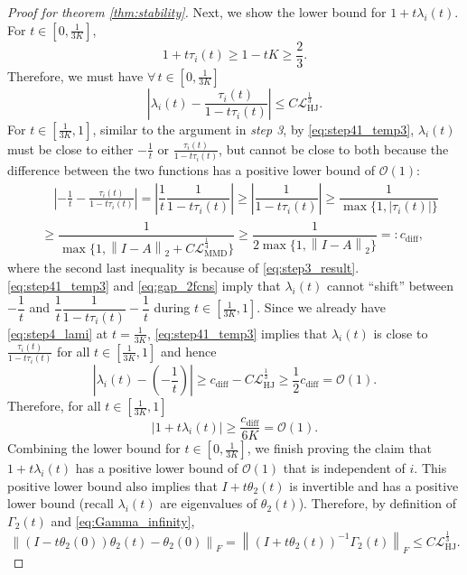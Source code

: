 \documentclass{article} %
\theoremstyle{plain}
\theoremstyle{definition}
\theoremstyle{remark}
\newcommand{\cO}{\mathcal{O}}
\newcommand{\norm}[2][H^s]{\left\|#2\right\|_{#1}}
\newcommand{\LMMD}{\mathcal{L}_{\text{MMD}}}
\newcommand{\LHJ}{\mathcal{L}_{\text{HJ}}}
\newcommand{\lam}{\lambda}
\newcommand{\Ge}{\Gamma_2}
\newcommand{\abs}[1]{\left|#1\right|}
\begin{document}
\begin{proof}[Proof for theorem \ref{thm:stability}]
Next, we show the lower bound for $1+t \lam_i(t)$. For $t\in [0,\frac{1}{3K}]$, 
$$1 + t\tau_i(t) \ge 1 - t K \ge \frac23.$$
Therefore, we must have $\forall \, t\in [0,\frac{1}{3K}]$
\begin{equation}\label{eq:step4_lami}
\abs{\lam_i(t) - \dfrac{\tau_i(t)}{1-t\tau_i(t)}} \le C \LHJ^{\frac13}.
\end{equation}
For $t \in [\frac{1}{3K}, 1]$, similar to the argument in \emph{step 3}, by \eqref{eq:step41_temp3}, $\lam_i(t)$ must be close to either $-\frac1t$ or $\frac{\tau_i(t)}{1-t\tau_i(t)}$, but cannot be close to both because the difference between the two functions has a positive lower bound of $\cO(1)$:
\begin{equation}\label{eq:gap_2fcns}
\begin{aligned}
& \quad \abs{-\frac1t - \frac{\tau_i(t)}{1-t\tau_i(t)}}=\abs{\dfrac{1}{t} \dfrac{1}{1 - t \tau_i(t)}} \ge \abs{\dfrac{1}{1 - t \tau_i(t)}} \ge \dfrac{1}{\max\{1,|\tau_i(t)|\}} \\
&\ge \dfrac{1}{\max\{1,\norm[2]{I-A} + C \LMMD^{\frac14} \}} \ge \dfrac{1}{2\max\{1,\norm[2]{I-A} \}} =: c_{\textrm{diff}},
\end{aligned}
\end{equation}
where the second last inequality is because of \eqref{eq:step3_result}. \eqref{eq:step41_temp3} and \eqref{eq:gap_2fcns} imply that $\lam_i(t)$ cannot ``shift'' between $-\dfrac{1}{t}$ and $\dfrac{1}{t} \dfrac{1}{1 - t \tau_i(t)} -\dfrac{1}{t}$ during $t\in[\frac{1}{3K},1]$. Since we already have \eqref{eq:step4_lami} at $t=\frac{1}{3K}$, \eqref{eq:step41_temp3} implies that $\lam_i(t)$ is close to $\frac{\tau_i(t)}{1-t\tau_i(t)}$ for all $t \in [\frac{1}{3K},1]$ and hence 
$$\abs{\lam_i(t) - (-\frac1t)} \ge c_{\text{diff}} - C \LHJ^{\frac13} \ge \frac12 c_{\text{diff}} = \cO(1).$$
Therefore, for all $t \in [\frac{1}{3K}, 1]$
$$\abs{1+t\lam_i(t)} \ge \dfrac{c_{\text{diff}}}{6K}=\cO(1).$$
Combining the lower bound for $t \in [0, \frac{1}{3K}]$, we finish proving the claim that $1+t\lam_i(t)$ has a positive lower bound of $\cO(1)$ that is independent of $i$. This positive lower bound also implies that $I + t \theta_2(t)$ is invertible and has a positive lower bound (recall $\lam_i(t)$ are eigenvalues of $\theta_2(t)$). Therefore, by definition of $\Ge(t)$ and \eqref{eq:Gamma_infinity},
\begin{equation}\label{eq:step41_temp1}
\norm[F]{(I-t\theta_2(0)) \theta_2(t) - \theta_2(0)} = \norm[F]{(I + t\theta_2(t))^{-1} \Ge(t)} \le C \LHJ^{\frac13}.
\end{equation}


\end{proof}
\end{document}
